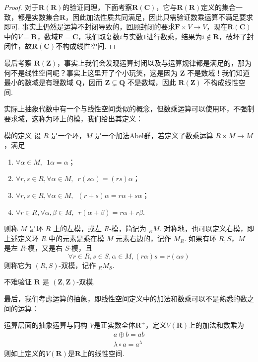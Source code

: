 \begin{proof}
    对于$\mathbf{R(R)}$的验证同理，下面考察$\mathbf{R}(\mathbf{C})$，它与$\mathbf{R(R)}$定义的集合一致，都是实数集合$\mathbf{R}$，因此加法性质共同满足，因此只需验证数乘运算不满足要求即可. 事实上仍然是运算不封闭导致的，回顾封闭的要求$\mathbf{F}\times V\to V$，现在$\mathbf{R(C)}$中的$V=\mathbf{R}$，数域$\mathbf{F}=\mathbf{C}$，我们取复数$i$与实数$1$进行数乘，结果为$i\notin\mathbf{R}$，破坏了封闭性，故$\mathbf{R(C)}$不构成线性空间.
\end{proof}

最后考察 $\mathbf{R(Z)}$，事实上我们会发现运算封闭以及与运算规律都是满足的，那为何不是线性空间呢？事实上这里开了个小玩笑，这是因为 $\mathbf{Z}$ 不是数域！我们知道最小的数域是有理数域 $\mathbf{Q}$，因而 $\mathbf{Z} \subsetneq \mathbf{Q}$ 不是数域，因此 $\mathbf{R(Z)}$ 不构成线性空间.

实际上抽象代数中有一个与线性空间类似的概念，但数乘运算可以使用环，不强制要求域，这称为环上的模，我们给出其定义：
\begin{definition}{模的定义}{}
    设 $R$ 是一个环，$M$ 是一个加法Abel群，若定义了数乘运算 $R \times M \to M$，满足
    \begin{enumerate}
        \item $\forall \alpha \in M, \enspace 1\alpha = \alpha$；
        \item $\forall r, s \in R, \forall \alpha \in M, \enspace r(s\alpha) = (rs)\alpha$；
        \item $\forall r, s \in R, \forall \alpha \in M, \enspace (r+s)\alpha = r\alpha + s\alpha$；
        \item $\forall r \in R, \forall \alpha, \beta \in M, \enspace r(\alpha + \beta) = r\alpha + r\beta$.
    \end{enumerate}
    则称 $M$ 是环 $R$ 上的左模，或左 $R$-模，简记为 $_R M$. 对称地，也可以定义右模，即上述定义环 $R$ 中的元素是乘在模 $M$ 元素右边的，记作 $M_R$. 如果有环 $R, S$，$M$ 是左 $R$-模，又是右 $S$-模，且
    \[
        \forall r \in R, s \in S, \alpha \in M, (r \alpha) s = r (\alpha s)
    \]
    则称它为 $(R, S)$-双模，记作 $_R M_S$.
\end{definition}

不难验证 $\mathbf{R}$ 是 $(\mathbf{Z},\mathbf{Z})$-双模.

最后，我们考虑运算的抽象，即线性空间定义中的加法和数乘可以不是熟悉的数之间的运算：
\begin{example}{运算层面的抽象}{运算与同构}
    $V$是正实数全体$\mathbf{R}^+$，定义$V(\mathbf{R})$上的加法和数乘为
    \begin{gather*}
        a\oplus b=ab \\
        \lambda\circ a=a^\lambda
    \end{gather*}
    则如上定义的$V(\mathbf{R})$是$\mathbf{R}$上的线性空间.
\end{example}

